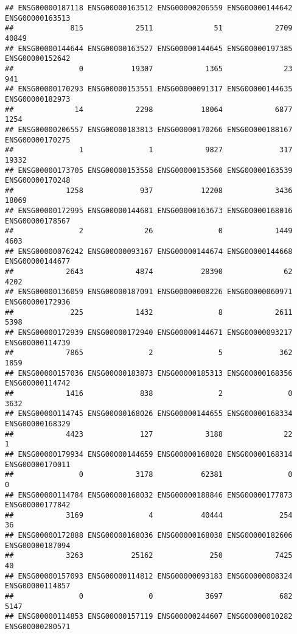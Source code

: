 \documentclass[
]{article}
\begin{document}
\begin{verbatim}
## ENSG00000187118 ENSG00000163512 ENSG00000206559 ENSG00000144642 ENSG00000163513 
##             815            2511              51            2709           40849 
## ENSG00000144644 ENSG00000163527 ENSG00000144645 ENSG00000197385 ENSG00000152642 
##               0           19307            1365              23             941 
## ENSG00000170293 ENSG00000153551 ENSG00000091317 ENSG00000144635 ENSG00000182973 
##              14            2298           18064            6877            1254 
## ENSG00000206557 ENSG00000183813 ENSG00000170266 ENSG00000188167 ENSG00000170275 
##               1               1            9827             317           19332 
## ENSG00000173705 ENSG00000153558 ENSG00000153560 ENSG00000163539 ENSG00000170248 
##            1258             937           12208            3436           18069 
## ENSG00000172995 ENSG00000144681 ENSG00000163673 ENSG00000168016 ENSG00000178567 
##               2              26               0            1449            4603 
## ENSG00000076242 ENSG00000093167 ENSG00000144674 ENSG00000144668 ENSG00000144677 
##            2643            4874           28390              62            4202 
## ENSG00000136059 ENSG00000187091 ENSG00000008226 ENSG00000060971 ENSG00000172936 
##             225            1432               8            2611            5398 
## ENSG00000172939 ENSG00000172940 ENSG00000144671 ENSG00000093217 ENSG00000114739 
##            7865               2               5             362            1859 
## ENSG00000157036 ENSG00000183873 ENSG00000185313 ENSG00000168356 ENSG00000114742 
##            1416             838               2               0            3632 
## ENSG00000114745 ENSG00000168026 ENSG00000144655 ENSG00000168334 ENSG00000168329 
##            4423             127            3188              22               1 
## ENSG00000179934 ENSG00000144659 ENSG00000168028 ENSG00000168314 ENSG00000170011 
##               0            3178           62381               0               0 
## ENSG00000114784 ENSG00000168032 ENSG00000188846 ENSG00000177873 ENSG00000177842 
##            3169               4           40444             254              36 
## ENSG00000172888 ENSG00000168036 ENSG00000168038 ENSG00000182606 ENSG00000187094 
##            3263           25162             250            7425              40 
## ENSG00000157093 ENSG00000114812 ENSG00000093183 ENSG00000008324 ENSG00000114857 
##               0               0            3697             682            5147 
## ENSG00000114853 ENSG00000157119 ENSG00000244607 ENSG00000010282 ENSG00000280571 

\end{verbatim}
\end{document}
